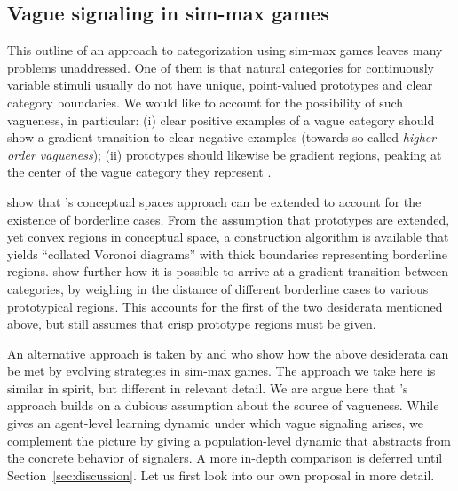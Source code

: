 \documentclass[fleqn,reqno,10pt]{article}
\begin{document}
\subsection{Vague signaling in sim-max games}

This outline of an approach to categorization using sim-max games
leaves many problems unaddressed. One of them is that natural
categories for continuously variable stimuli usually do not have
unique, point-valued prototypes and clear category boundaries. We
would like to account for the possibility of such vagueness, in
particular: (i) clear positive examples of a vague category should
show a gradient transition to clear negative examples (towards
so-called \emph{higher-order vagueness});
(ii) prototypes should likewise be gradient regions, peaking at the
center of the vague category they represent
\citep[e.g.][]{Sainsbury1991:Is-There-Higher,KeefeSmith1997:Vagueness:-A-Re}.

\citet{DouvenDecock2011:Vagueness:-A-Co} show that
\citeauthor{Gardenfors2000:Conceptual-Spac}'s conceptual spaces
approach can be extended to account for the existence of borderline
cases. From the assumption that prototypes are extended, yet convex
regions in conceptual space, a construction algorithm is available
that yields ``collated Voronoi diagrams'' with thick boundaries
representing borderline
regions. \citet{DecockDouven2012:What-is-Graded-} show further how it
is possible to arrive at a gradient transition between categories, by
weighing in the distance of different borderline cases to various
prototypical regions. This accounts for the first of the two
desiderata mentioned above, but still assumes that crisp prototype
regions must be given.

An alternative approach is taken by
\citet{FrankeJager2010:Vagueness-Signa} and
\citet{OConnor2013:The-Evolution-o} who show how the above desiderata
can be met by evolving strategies in sim-max games. The approach we
take here is similar in spirit, but different in relevant detail. We
are argue here that \citeauthor{FrankeJager2010:Vagueness-Signa}'s
approach builds on a dubious assumption about the source of
vagueness. While \citeauthor{OConnor2013:The-Evolution-o} gives an
agent-level learning dynamic under which vague signaling arises, we
complement the picture by giving a population-level dynamic that
abstracts from the concrete behavior of signalers. A more in-depth
comparison is deferred until Section~\ref{sec:discussion}. Let us
first look into our own proposal in more detail.
\end{document}
